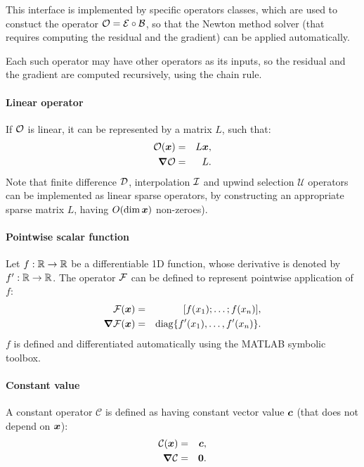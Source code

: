 This interface is implemented by specific operators classes,
which are used to constuct the operator $\mathcal{O} = \mathcal{E} \circ \mathcal{B}$, so that 
the Newton method solver (that requires computing the residual and the gradient) 
can be applied automatically.

Each such operator may have other operators as its inputs, so the residual
and the gradient are computed recursively, using the chain rule.

\paragraph{Linear operator}
If $\mathcal{O}$ is linear, it can be represented by a matrix $L$, such that:
\begin{eqnarray}
\mathcal{O}(\boldsymbol{x}) &=& L \boldsymbol{x}, \\
\boldsymbol{\nabla}\mathcal{O} &=& L. 
\end{eqnarray}
Note that finite difference $\mathcal{D}$, interpolation $\mathcal{I}$ and 
upwind selection $\mathcal{U}$ operators
can be implemented as linear sparse operators, by constructing 
an appropriate sparse matrix $L$, having $O(\dim \boldsymbol{x})$ non-zeroes).

\paragraph{Pointwise scalar function}
Let $f: \mathbb{R} \rightarrow \mathbb{R}$ be a differentiable 1D function, whose derivative is
denoted by $f': \mathbb{R} \rightarrow \mathbb{R}$. The operator $\mathcal{F}$ can be defined to
represent pointwise application of $f$:
\begin{eqnarray}
\mathcal{F}(\boldsymbol{x}) &=& [f(x_1); \ldots; f(x_n)], \\
\boldsymbol{\nabla}\mathcal{F}(\boldsymbol{x}) &=& \mathrm{diag}\{f'(x_1), \ldots, f'(x_n)\}.
\end{eqnarray}
$f$ is defined and differentiated automatically using the MATLAB symbolic toolbox.

\paragraph{Constant value}
A constant operator $\mathcal{C}$ is defined as having constant vector value $\boldsymbol{c}$ 
(that does not depend on $\boldsymbol{x}$):
\begin{eqnarray}
\mathcal{C}(\boldsymbol{x}) &=& \boldsymbol{c}, \\
\boldsymbol{\nabla}\mathcal{C} &=& \boldsymbol{0}.
\end{eqnarray}

